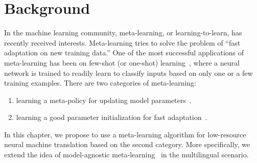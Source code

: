 \section{Background}






In the machine learning community, meta-learning, or learning-to-learn, has recently received interests. Meta-learning tries to solve the problem of “fast adaptation on new training data.”  One of the most successful applications of meta-learning has been on few-shot (or one-shot) learning~\citep{lake2015human}, where a neural network is trained to readily learn to classify inputs based on only one or a few training examples. There are two categories of meta-learning:
\begin{enumerate}
    \item learning a meta-policy for updating model parameters~\citep[see, e.g.,][]{andrychowicz2016learning,ha2016hypernetworks,mishra2017meta}.
    \item  learning a good parameter initialization for fast adaptation~\citep[see, e.g.,][]{finn2017model,vinyals2016matching,snell2017prototypical}. 
\end{enumerate}
In this chapter, we propose to use a meta-learning algorithm for low-resource neural machine translation based on the second category. More specifically, we extend the idea of model-agnostic meta-learning~\citep[MAML,][]{finn2017model} in the multilingual scenario.


